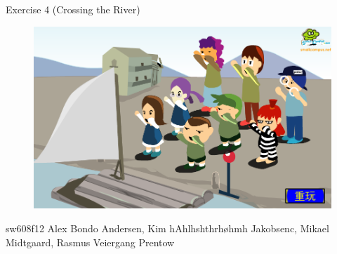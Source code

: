 \huge{Exercise 4 (Crossing the River)}

\begin{figure}%
\includegraphics[width=\columnwidth]{pictures/front.png}%
\end{figure}

\large{sw608f12}
\large{Alex Bondo Andersen, Kim hAhlhshthrhøhmh Jakobsenc, Mikael Midtgaard, Rasmus Veiergang Prentow}